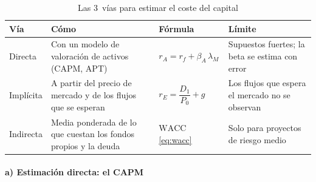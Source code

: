 \documentclass[11pt]{article}
\begin{document}
\begin{table}[H]
\centering
\caption{Las 3~vías para estimar el coste del capital}\label{tab:vias-coste}
\begin{tabular}{>{\raggedright\arraybackslash}m{2.4cm}>{\raggedright\arraybackslash}m{4.4cm}>{\centering\arraybackslash}m{3.6cm}>{\raggedright\arraybackslash}m{3.6cm}}
\toprule
\rowcolor{tceeazulpalido}\textbf{Vía} & \textbf{Cómo} & \textbf{Fórmula} & \textbf{Límite} \\
\midrule
\textcolor{tceeazul}{Directa} & Con un modelo de valoración de activos (CAPM, APT) & $r_A=r_f+\beta_A\,\lambda_M$ & Supuestos fuertes; la beta se estima con error \\
\textcolor{tceeverde}{Implícita} & A partir del precio de mercado y de los flujos que se esperan & $r_E=\dfrac{D_1}{P_0}+g$ & Los flujos que espera el mercado no se observan \\
\textcolor{tceemorado}{Indirecta} & Media ponderada de lo que cuestan los fondos propios y la deuda & $\mathrm{WACC}$ \eqref{eq:wacc} & Solo para proyectos de riesgo medio \\
\bottomrule
\end{tabular}
\end{table}

\paragraph{a) Estimación directa: el CAPM}
\end{document}
